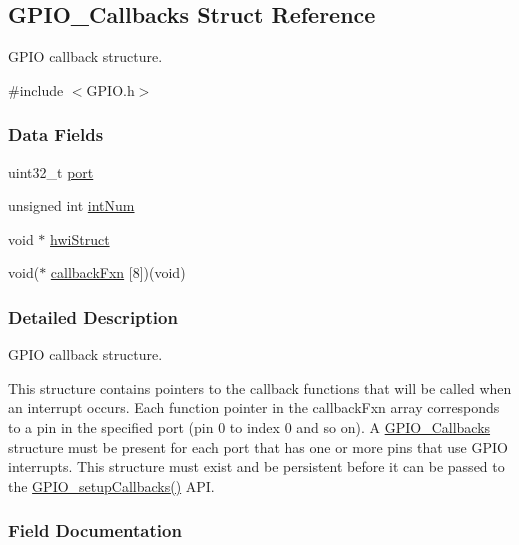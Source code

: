 \subsection{G\-P\-I\-O\-\_\-\-Callbacks Struct Reference}
\label{struct_g_p_i_o___callbacks}


G\-P\-I\-O callback structure.  




{\ttfamily \#include $<$G\-P\-I\-O.\-h$>$}

\subsubsection*{Data Fields}
\begin{DoxyCompactItemize}
\item 
uint32\-\_\-t \hyperlink{struct_g_p_i_o___callbacks_a9d5a44874bdf49a24cc8cf54f9b8446f}{port}
\item 
unsigned int \hyperlink{struct_g_p_i_o___callbacks_a88b6e3699c7f43dafede6c5218879266}{int\-Num}
\item 
void $\ast$ \hyperlink{struct_g_p_i_o___callbacks_ab51375f9fd94a988557ce02e2d59c1f1}{hwi\-Struct}
\item 
void($\ast$ \hyperlink{struct_g_p_i_o___callbacks_a73498caaad6418a4e155eac032809a12}{callback\-Fxn} \mbox{[}8\mbox{]})(void)
\end{DoxyCompactItemize}


\subsubsection{Detailed Description}
G\-P\-I\-O callback structure. 

This structure contains pointers to the callback functions that will be called when an interrupt occurs. Each function pointer in the callback\-Fxn array corresponds to a pin in the specified port (pin 0 to index 0 and so on). A \hyperlink{struct_g_p_i_o___callbacks}{G\-P\-I\-O\-\_\-\-Callbacks} structure must be present for each port that has one or more pins that use G\-P\-I\-O interrupts. This structure must exist and be persistent before it can be passed to the \hyperlink{_g_p_i_o_8h_af00c188a9e451094c5de1109141f30db}{G\-P\-I\-O\-\_\-setup\-Callbacks()} A\-P\-I. 

\subsubsection{Field Documentation}
